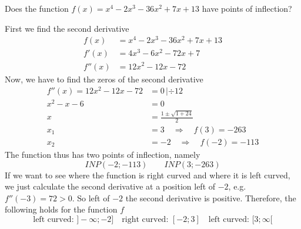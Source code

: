 \documentclass[12pt,eng]{skript_ogg}
\begin{document}
\begin{beispiel}
Does the function $f(x)=x^4-2x^3-36x^2+7x+13$ have points of inflection?

First we find the second derivative
\begin{align*}
f(x)&=x^4-2x^3-36x^2+7x+13\\
f'(x)&=4x^3-6x^2-72x+7\\
f''(x)&=12x^2-12x-72
\end{align*}
Now, we have to find the zeros of the second derivative
\begin{align*}
f''(x)=12x^2-12x-72&=0\,|\div12\\
x^2-x-6&=0\\
x&=\frac{1\pm\sqrt{1+24}}{2}\\
x_1&=3\quad\Rightarrow\quad f(3)=-263\\
x_2&=-2\quad\Rightarrow\quad f(-2)=-113
\end{align*}
The function thus has two points of inflection, namely
\[INP(-2;-113)\qquad INP(3;-263)\]
If we want to see where the function is right curved and where it is left curved, we just calculate the second derivative at a position left of $-2$, e.g.\ $f''(-3)=72>0$. So left of $-2$ the second derivative is positive. Therefore, the following holds for the function $f$
\[\mbox{left curved: }]-\infty;-2]\quad\mbox{right curved: }[-2;3]\quad\mbox{left curved: }[3;\infty[\]
\end{beispiel}
\end{document}

